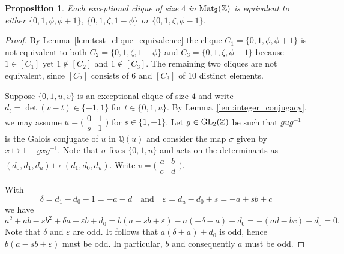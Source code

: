 \documentclass{amsart}
\theoremstyle{plain}
\newtheorem{proposition}[theorem]{Proposition}
\theoremstyle{definition}
\newcommand{\Z}{\ensuremath{\mathbb{Z}}}
\newcommand{\Q}{\ensuremath{\mathbb{Q}}}
\newcommand{\clq}{C}
\begin{document}
\begin{proposition}\label{prop:dim2_conj}
	Each exceptional clique of size \(4\) in \(\textup{Mat}_2(\Z)\) is equivalent to either \(\{0,1,\phi,\phi+1\}\), \(\{0,1,\zeta,1-\phi\}\) or \(\{0,1,\zeta,\phi-1\}\).
\end{proposition}
\begin{proof}
	By Lemma~\ref{lem:test_clique_equivalence} the clique \(\clq_1=\{0,1,\phi,\phi+1\}\) is not equivalent to both \(\clq_2=\{0,1,\zeta,1-\phi\}\) and \(\clq_3=\{0,1,\zeta,\phi-1\}\) because \(1\in[\clq_1]\) yet \(1\not\in[\clq_2]\) and \(1\not\in[\clq_3]\). The remaining two cliques are not equivalent, since \([\clq_2]\) consists of \(6\) and \([\clq_3]\) of \(10\) distinct elements.
	
	Suppose \(\{0,1,u,v\}\) is an exceptional clique of size \(4\) and write \(d_t=\det(v-t)\in\{-1,1\}\) for \(t\in\{0,1,u\}\).
	By Lemma~\ref{lem:integer_conjugacy}, we may assume \(u=\big(\begin{smallmatrix}0&1\\s&1\end{smallmatrix}\big)\) for \(s\in\{1,-1\}\).
	Let \(g\in\textup{GL}_2(\Z)\) be such that \(gug^{-1}\) is the Galois conjugate of \(u\) in \(\Q(u)\) and consider the map \(\sigma\) given by \(x\mapsto 1-gxg^{-1}\).
	Note that \(\sigma\) fixes \(\{0,1,u\}\) and acts on the determinants as \((d_0,d_1,d_u)\mapsto (d_1,d_0,d_u)\).
	Write \(v=\big(\begin{smallmatrix}a&b\\c&d\end{smallmatrix}\big)\).

	With 
	\[\delta=d_1-d_0-1=-a-d \quad\text{and}\quad \varepsilon=d_u-d_0+s=-a+sb+c\] 
	we have
	\[a^2+ab-sb^2+\delta a + \varepsilon b + d_0=b(a-sb+\varepsilon)-a(-\delta-a) + d_0 = -(ad-bc)+d_0 = 0 \tag{2}\label{eq:X}.\]
	Note that \(\delta\) and \(\varepsilon\) are odd.
	It follows that \(a(\delta+a)+d_0\) is odd, hence \(b(a-sb+\varepsilon)\) must be odd.
	In particular, \(b\) and consequently \(a\) must be odd.
	

\end{proof}
\end{document}
